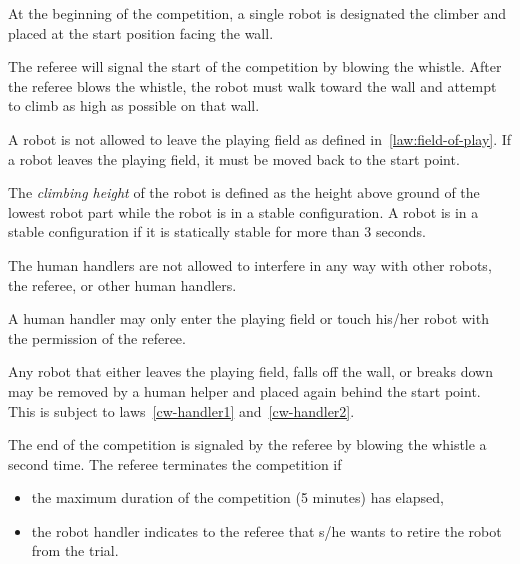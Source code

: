 \documentclass[12pt]{hurocup}
\begin{document}
\begin{lawlist}[CW]
  
\item At the beginning of the competition, a single robot is
  designated the climber and placed at the start position facing the
  wall.

\item The referee will signal the start of the competition by blowing
  the whistle. After the referee blows the whistle, the robot must
  walk toward the wall and attempt to climb as high as possible on
  that wall.

\item A robot is not allowed to leave the playing field as defined
  in~\ref{law:field-of-play}.  If a robot leaves the playing field, it
  must be moved back to the start point.

\item The \emph{climbing height} of the robot is defined as the height
  above ground of the lowest robot part while the robot is in a stable
  configuration. A robot is in a stable configuration if it is
  statically stable for more than 3 seconds.

\item \label{cw-handler1} The human handlers are not allowed to
  interfere in any way with other robots, the referee, or other human
  handlers.

\item \label{cw-handler2} A human handler may only enter the playing
  field or touch his/her robot with the permission of the referee.

\item Any robot that either leaves the playing field, falls off the
  wall, or breaks down may be removed by a human helper and placed
  again behind the start point. This is subject to
  laws~\ref{cw-handler1} and~\ref{cw-handler2}.

\item The end of the competition is signaled by the referee by blowing
  the whistle a second time. The referee terminates the competition
  if
  \begin{itemize}
    \item the maximum duration of the competition (5 minutes) has
      elapsed,
    \item the robot handler indicates to the referee that s/he wants
      to retire the robot from the trial.
  \end{itemize}

\end{lawlist}
\end{document}
